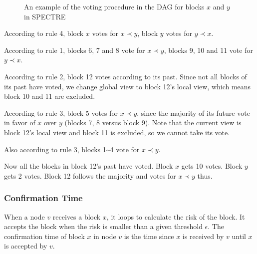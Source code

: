 \documentclass[a4paper,11pt]{article}
\begin{document}
\begin{figure}[ht]
	\centerline{%
	}
\caption{An example of the voting procedure in the DAG for blocks $x$ and $y$ in SPECTRE}
\end{figure}

According to rule 4, block $x$ votes for $x \prec y$, block $y$ votes for $y
\prec x$.

According to rule 1, blocks 6, 7 and 8 vote for $x \prec y$, blocks 9, 10 and 11
vote for $y \prec x$.

According to rule 2, block 12 votes according to its past. Since not all blocks
of its past have voted, we change global view to block 12's local view, which
means block 10 and 11 are excluded.

According to rule 3, block 5 votes for $x \prec y$, since the majority of its
future vote in favor of $x$ over $y$ (blocks 7, 8 versus block 9). Note that the
current view is block 12's local view and block 11 is excluded, so we cannot
take its vote.

Also according to rule 3, blocks 1\textasciitilde4 vote for $x \prec y$.

Now all the blocks in block 12's past have voted. Block $x$ gets 10 votes. Block
$y$ gets 2 votes. Block 12 follows the majority and votes for $x \prec y$ thus.


\subsubsection*{Confirmation Time}

When a node $v$ receives a block $x$, it loops to calculate the  risk of
the block. It accepts the block when the risk is smaller than a given threshold
$\epsilon$. The confirmation time of block $x$ in node $v$ is the time
since $x$ is received by $v$ until $x$ is accepted by $v$.
\end{document}
